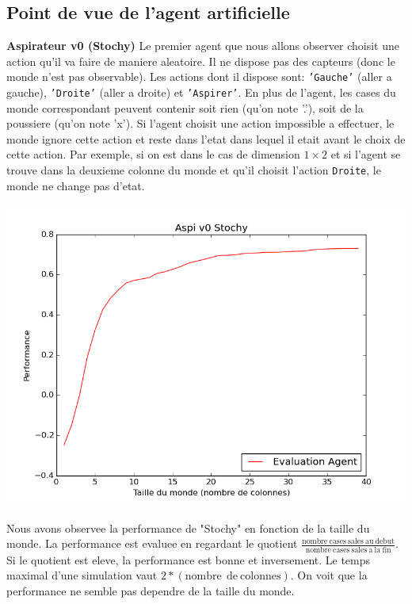 \documentclass[12pt]{article}
\begin{document}
\subsection{Point de vue de l'agent artificielle }
\justify
\textbf{Aspirateur v0 (Stochy)}
\justify
Le premier agent que nous allons observer choisit une action qu'il va faire de maniere aleatoire. Il ne dispose pas des capteurs (donc le monde n'est pas observable). Les actions dont il dispose sont: \texttt{'Gauche'} (aller a gauche), \texttt{'Droite'} (aller a droite) et \texttt{'Aspirer'}.
\justify 
En plus de l'agent, les cases du monde correspondant peuvent contenir soit rien (qu'on note '.'), soit de la poussiere (qu'on note 'x'). Si l'agent choisit une action impossible a effectuer, le monde ignore cette action et reste dans l'etat dans lequel il etait avant le choix de cette action. Par exemple, si on est dans le cas de dimension $1 \times 2$ et si l'agent se trouve dans la deuxieme colonne du monde et qu'il choisit l'action \texttt{Droite}, le monde ne change pas d'etat. 
\begin{center}
\includegraphics[scale=0.65]{figure_1}
\end{center}
\justify
Nous avons observee la performance de "Stochy" en fonction de la taille du monde. La performance est evaluee en regardant le quotient $\frac{\mathrm{nombre \ cases \  sales \  au \ debut}}{\mathrm{nombre \  cases \  sales  \ a \ la \ fin}}$. Si le quotient est eleve, la performance est bonne et inversement. Le temps maximal d'une simulation vaut $2*\mathrm{(nombre \   \ de \  colonnes)}$. On voit que la performance ne semble pas dependre de la taille du monde. 
\end{document}
